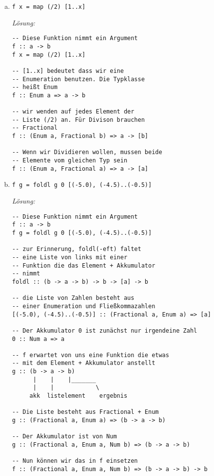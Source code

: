 \documentclass{article}
\begin{document}
\begin{enumerate} [a)]
\newpage

    \item \begin{verbatim}
f x = map (/2) [1..x]
          \end{verbatim}

    \textit{Lösung:}
    \begin{mdframed}[backgroundcolor=bg]
        \begin{verbatim}
-- Diese Funktion nimmt ein Argument
f :: a -> b
f x = map (/2) [1..x]

-- [1..x] bedeutet dass wir eine 
-- Enumeration benutzen. Die Typklasse
-- heißt Enum
f :: Enum a => a -> b

-- wir wenden auf jedes Element der
-- Liste (/2) an. Für Divison brauchen
-- Fractional
f :: (Enum a, Fractional b) => a -> [b]

-- Wenn wir Dividieren wollen, mussen beide
-- Elemente vom gleichen Typ sein
f :: (Enum a, Fractional a) => a -> [a]
         \end{verbatim}
    \end{mdframed}

\newpage

    \item \begin{verbatim}
f g = foldl g 0 [(-5.0), (-4.5)..(-0.5)]
          \end{verbatim}

    \textit{Lösung:}
    \begin{mdframed}[backgroundcolor=bg]
        \begin{verbatim}
-- Diese Funktion nimmt ein Argument
f :: a -> b
f g = foldl g 0 [(-5.0), (-4.5)..(-0.5)]

-- zur Erinnerung, foldl(-eft) faltet
-- eine Liste von links mit einer
-- Funktion die das Element + Akkumulator
-- nimmt
foldl :: (b -> a -> b) -> b -> [a] -> b

-- die Liste von Zahlen besteht aus
-- einer Enumeration und Fließkommazahlen
[(-5.0), (-4.5)..(-0.5)] :: (Fractional a, Enum a) => [a]

-- Der Akkumulator 0 ist zunächst nur irgendeine Zahl
0 :: Num a => a

-- f erwartet von uns eine Funktion die etwas
-- mit dem Element + Akkumulator anstellt
g :: (b -> a -> b)
      |    |    |_______
      |    |            \
     akk  listelement    ergebnis

-- Die Liste besteht aus Fractional + Enum
g :: (Fractional a, Enum a) => (b -> a -> b)

-- Der Akkumulator ist von Num
g :: (Fractional a, Enum a, Num b) => (b -> a -> b)

-- Nun können wir das in f einsetzen
f :: (Fractional a, Enum a, Num b) => (b -> a -> b) -> b
         \end{verbatim}
    \end{mdframed}

\end{enumerate}
\end{document}
